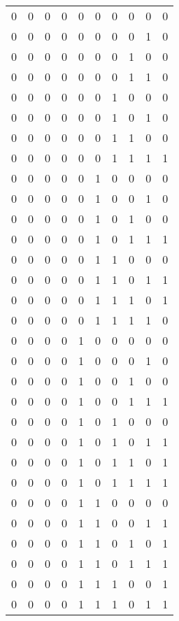 \begin{longtable}[c]{rrrrrrrrrr}
        0 & 0 & 0 & 0 & 0 & 0 & 0 & 0 & 0 & 0 \\
        0 & 0 & 0 & 0 & 0 & 0 & 0 & 0 & 1 & 0 \\
        0 & 0 & 0 & 0 & 0 & 0 & 0 & 1 & 0 & 0 \\
        0 & 0 & 0 & 0 & 0 & 0 & 0 & 1 & 1 & 0 \\
        0 & 0 & 0 & 0 & 0 & 0 & 1 & 0 & 0 & 0 \\
        0 & 0 & 0 & 0 & 0 & 0 & 1 & 0 & 1 & 0 \\
        0 & 0 & 0 & 0 & 0 & 0 & 1 & 1 & 0 & 0 \\
        0 & 0 & 0 & 0 & 0 & 0 & 1 & 1 & 1 & 1 \\
        0 & 0 & 0 & 0 & 0 & 1 & 0 & 0 & 0 & 0 \\
        0 & 0 & 0 & 0 & 0 & 1 & 0 & 0 & 1 & 0 \\
        0 & 0 & 0 & 0 & 0 & 1 & 0 & 1 & 0 & 0 \\
        0 & 0 & 0 & 0 & 0 & 1 & 0 & 1 & 1 & 1 \\
        0 & 0 & 0 & 0 & 0 & 1 & 1 & 0 & 0 & 0 \\
        0 & 0 & 0 & 0 & 0 & 1 & 1 & 0 & 1 & 1 \\
        0 & 0 & 0 & 0 & 0 & 1 & 1 & 1 & 0 & 1 \\
        0 & 0 & 0 & 0 & 0 & 1 & 1 & 1 & 1 & 0 \\
        0 & 0 & 0 & 0 & 1 & 0 & 0 & 0 & 0 & 0 \\
        0 & 0 & 0 & 0 & 1 & 0 & 0 & 0 & 1 & 0 \\
        0 & 0 & 0 & 0 & 1 & 0 & 0 & 1 & 0 & 0 \\
        0 & 0 & 0 & 0 & 1 & 0 & 0 & 1 & 1 & 1 \\
        0 & 0 & 0 & 0 & 1 & 0 & 1 & 0 & 0 & 0 \\
        0 & 0 & 0 & 0 & 1 & 0 & 1 & 0 & 1 & 1 \\
        0 & 0 & 0 & 0 & 1 & 0 & 1 & 1 & 0 & 1 \\
        0 & 0 & 0 & 0 & 1 & 0 & 1 & 1 & 1 & 1 \\
        0 & 0 & 0 & 0 & 1 & 1 & 0 & 0 & 0 & 0 \\
        0 & 0 & 0 & 0 & 1 & 1 & 0 & 0 & 1 & 1 \\
        0 & 0 & 0 & 0 & 1 & 1 & 0 & 1 & 0 & 1 \\
        0 & 0 & 0 & 0 & 1 & 1 & 0 & 1 & 1 & 1 \\
        0 & 0 & 0 & 0 & 1 & 1 & 1 & 0 & 0 & 1 \\
        0 & 0 & 0 & 0 & 1 & 1 & 1 & 0 & 1 & 1 \\

\end{longtable}
